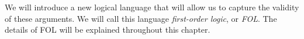 We will introduce a new logical language that will allow us to capture the validity of these arguments. We will call this language \emph{first-order logic}, or \emph{FOL}. The details of FOL will be explained throughout this chapter.

%
%
%
%
%
